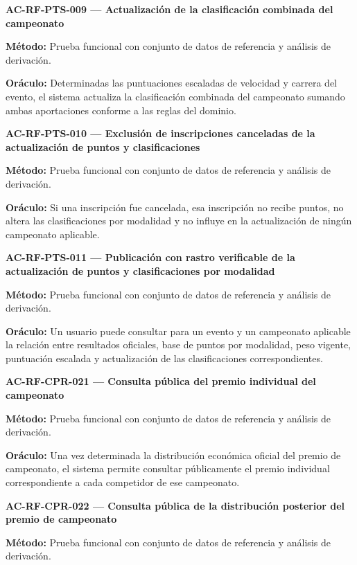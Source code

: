 \documentclass[10pt,letterpaper]{article}
\begin{document}
\noindent\textbf{AC-RF-PTS-009 --- Actualización de la clasificación combinada del campeonato}\par
\textbf{Método:} Prueba funcional con conjunto de datos de referencia y análisis de derivación.\par
\textbf{Oráculo:} Determinadas las puntuaciones escaladas de velocidad y carrera del evento, el sistema actualiza la clasificación combinada del campeonato sumando ambas aportaciones conforme a las reglas del dominio.\par\vspace{0.45em}
\noindent\textbf{AC-RF-PTS-010 --- Exclusión de inscripciones canceladas de la actualización de puntos y clasificaciones}\par
\textbf{Método:} Prueba funcional con conjunto de datos de referencia y análisis de derivación.\par
\textbf{Oráculo:} Si una inscripción fue cancelada, esa inscripción no recibe puntos, no altera las clasificaciones por modalidad y no influye en la actualización de ningún campeonato aplicable.\par\vspace{0.45em}
\noindent\textbf{AC-RF-PTS-011 --- Publicación con rastro verificable de la actualización de puntos y clasificaciones por modalidad}\par
\textbf{Método:} Prueba funcional con conjunto de datos de referencia y análisis de derivación.\par
\textbf{Oráculo:} Un usuario puede consultar para un evento y un campeonato aplicable la relación entre resultados oficiales, base de puntos por modalidad, peso vigente, puntuación escalada y actualización de las clasificaciones correspondientes.\par\vspace{0.45em}
\noindent\textbf{AC-RF-CPR-021 --- Consulta pública del premio individual del campeonato}\par
\textbf{Método:} Prueba funcional con conjunto de datos de referencia y análisis de derivación.\par
\textbf{Oráculo:} Una vez determinada la distribución económica oficial del premio de campeonato, el sistema permite consultar públicamente el premio individual correspondiente a cada competidor de ese campeonato.\par\vspace{0.45em}
\noindent\textbf{AC-RF-CPR-022 --- Consulta pública de la distribución posterior del premio de campeonato}\par
\textbf{Método:} Prueba funcional con conjunto de datos de referencia y análisis de derivación.\par
\end{document}
